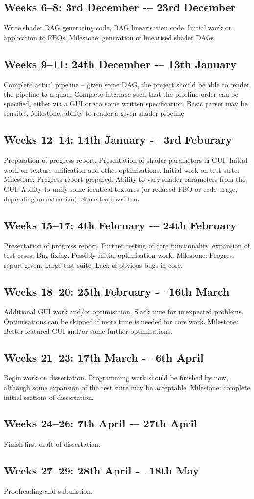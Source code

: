 \subsection*{Weeks 6--8: 3rd December -– 23rd December}
Write shader DAG generating code, DAG linearisation code. Initial work on application to FBOs.
Milestone: generation of linearised shader DAGs
\subsection*{Weeks 9--11: 24th December -– 13th January}
Complete actual pipeline – given some DAG, the project should be able to render the pipeline to a
quad. Complete interface such that the pipeline order can be specified, either via a GUI or via some
written specification. Basic parser may be sensible.
Milestone: ability to render a given shader pipeline
\subsection*{Weeks 12--14: 14th January -– 3rd Feburary}
Preparation of progress report. Presentation of shader parameters in GUI. Initial
work on texture unification and other optimisations. Initial work on test suite.
Milestone: Progress report prepared. Ability to vary shader parameters from the GUI. Ability to
unify some identical textures (or reduced FBO or code usage, depending on extension). Some tests
written.
\subsection*{Weeks 15--17: 4th February -– 24th February}
Presentation of progress report. Further testing of core functionality, expansion of test cases. Bug
fixing. Possibly initial
optimisation work.
Milestone: Progress report given. Large test suite. Lack of obvious bugs in core.
\subsection*{Weeks 18--20: 25th February -– 16th March}
Additional GUI work and/or optimisation. Slack time for unexpected problems. Optimisations can
be skipped if more time is needed for core work.
Milestone: Better featured GUI and/or some further optimisations.
\subsection*{Weeks 21--23: 17th March -– 6th April}
Begin work on dissertation. Programming work should be finished by now, although some
expansion of the test suite may be acceptable.
Milestone: complete initial sections of dissertation.
\subsection*{Weeks 24--26: 7th April -– 27th April}
Finish first draft of dissertation.
\subsection*{Weeks 27--29: 28th April -– 18th May}
Proofreading and submission.
